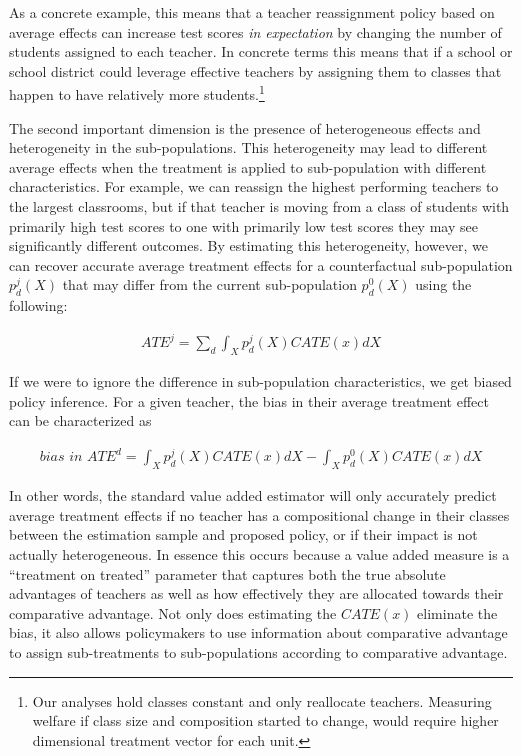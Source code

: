 \documentclass[12pt]{article}
\theoremstyle{definition}
\theoremstyle{definition}
\theoremstyle{definition}
\theoremstyle{definition}
\begin{document}
    As a concrete example, this means that a teacher reassignment policy based on average effects can increase test scores \textit{in expectation} by changing the number of students assigned to each teacher. In concrete terms this means that if a school or school district could leverage effective teachers by assigning them to classes that happen to have relatively more students.\footnote{Our analyses hold classes constant and only reallocate teachers. Measuring welfare if class size and composition started to change, would require higher dimensional treatment vector for each unit.} 
    
    The second important dimension is the presence of heterogeneous effects and heterogeneity in the sub-populations. This heterogeneity may lead to different average effects when the treatment is applied to sub-population with different characteristics. For example, we can reassign the highest performing teachers to the largest classrooms, but if that teacher is moving from a class of students with primarily high test scores to one with primarily low test scores they may see significantly different outcomes. By estimating this heterogeneity, however, we can recover accurate average treatment effects for a counterfactual sub-population $p^j_d(X)$ that may differ from the current sub-population $p^0_d(X)$ using the following: 
    
    \begin{equation}
    \begin{aligned}
    ATE^j =  \sum_d \int_X p^j_d(X) CATE(x) dX
    \end{aligned}
    \end{equation} 
    
    If we were to ignore the difference in sub-population characteristics, we get biased policy inference. For a given teacher, the bias in their average treatment effect can be characterized as 
    
    \begin{equation}
    \begin{aligned}
    \textit{bias in } ATE^d 
    =  \int_X p^j_d(X) CATE(x) dX - \int_X  p^0_d(X) CATE(x) dX
    \end{aligned}
    \end{equation} 
    
    
    \noindent In other words, the standard value added estimator will only accurately predict average treatment effects if no teacher has a compositional change in their classes between the estimation sample and proposed policy, or if their impact is not actually heterogeneous. In essence this occurs because a value added measure is a ``treatment on treated'' parameter that captures both the true absolute advantages of teachers as well as how effectively they are allocated towards their comparative advantage. Not only does estimating the $CATE(x)$ eliminate the bias, it also allows policymakers to use information about comparative advantage to assign sub-treatments to sub-populations according to comparative advantage. 
\end{document}
